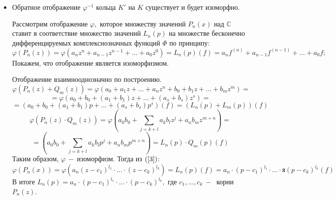 \begin{itemize}
    \item Обратное отображение $\varphi^{-1}$ кольца $K'$ на $K$ существует и будет изоморфно.\par
    Рассмотрим отображение $\varphi,$ которое множеству значений $P_n(x)$ над $\mathds{C}$ ставит в соответствие множество значений $L_n(p)$ на множестве бесконечно дифференцируемых комплекснозначных функций $\varPhi$ по принципу:
    $$\varphi(P_n(z))=\varphi(a_nz^n+a_{n-1}z^{n-1}+\dots+a_0z^0)=L_n(p)(f)=a_nf^{(n)}+a_{n-1}f^{(n-1)}+\dots+a_0f;$$
    Покажем, что отображение является изоморфизмом.\par Отображение взаимнооднозначно по построению.
    $$\varphi(P_n(z)+Q_m(z))=\varphi(a_0+a_1z+\dots+a_nz^n+b_0+b_1z+\dots+b_mz^m)=$$
    $$=\varphi(a_0+b_0+(a_1+b_1)z+\dots+(a_s+b_s)z^s)=$$
    $$=(a_0+b_0+(a_1+b_1)p+\dots+(a_s+b_s)p^s)(f)=(L_n(p)+L_m(p))(f)$$
    $$\varphi(P_n(z)\cdot Q_m(z))=\varphi(a_0b_0+\displaystyle\sum_{j=k+l}a_kb_lz^j+a_nb_mz^{m+n})=$$
    $$=(a_0b_0+\displaystyle\sum_{j=k+l}a_kb_lp^j+a_nb_mp^{m+n})=L_n(p)\cdot Q_m(p)(f)$$
    Таким образом, $\varphi~-~$изоморфизм. Тогда из $(\ref{3})$: $$\varphi(P_n(x))=\varphi(a_n(z-c_1)^{l_1}\cdot ...\cdot (z-c_k)^{l_k})= L_n(p)(f)=a_n\cdot (p-c_1)^{l_1}\cdot ... \cdot я(p-c_k)^{l_k}(f)$$
    В итоге  $L_n(p)=a_n\cdot (p-c_1)^{l_1}\cdot ... \cdot (p-c_k)^{l_k},$ где $c_1, \dots, c_k ~-~$ корни $P_n(z)$.
    
\end{itemize}
